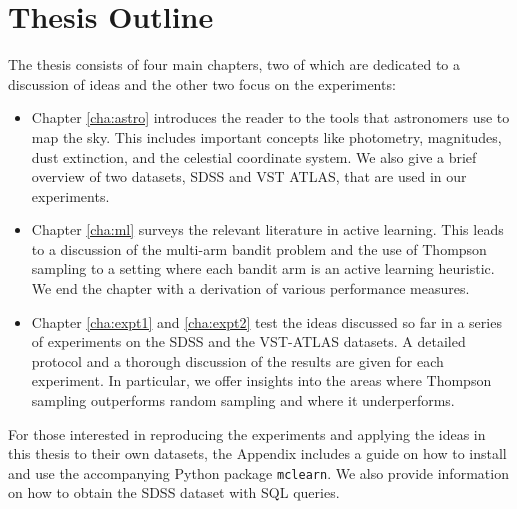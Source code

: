 \section{Thesis Outline}
\label{sec:orgnisation}
The thesis consists of four main chapters, two of which are dedicated to a discussion of ideas and
the other two focus on the experiments:
	\begin{itemize}
		\item Chapter \ref{cha:astro} introduces the reader to the tools that astronomers use
		to map the sky. This includes important concepts like photometry, magnitudes, dust
		extinction, and the celestial coordinate system. We also give a brief overview of
		two datasets, SDSS and VST ATLAS, that are used in our experiments.
		
		\item Chapter \ref{cha:ml} surveys the relevant literature in active learning. This leads
		to  a discussion of the multi-arm bandit problem and the use of Thompson sampling to a
		setting where each bandit arm is an active learning heuristic. We end the chapter with a 
		derivation of various performance measures.
		
		\item Chapter \ref{cha:expt1} and \ref{cha:expt2} test the ideas discussed so far in a
		series of experiments on the SDSS and the VST-ATLAS datasets. A detailed protocol and a
		thorough discussion of the results are given for each experiment. In particular, we offer
		insights into the areas where Thompson sampling outperforms random sampling and where it
		underperforms. 
	\end{itemize}
For those interested in reproducing the experiments and applying the ideas in this thesis
to their own datasets, the Appendix includes a guide on how to install and use the accompanying
Python package \texttt{mclearn}. We also provide information on how to obtain the SDSS dataset
with SQL queries.


